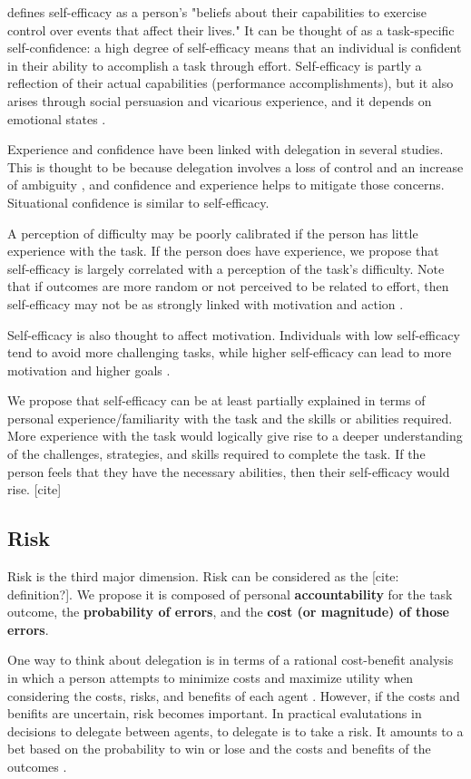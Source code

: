 \documentclass[letterpaper]{article} %
\begin{document}
\cite{Bandura-89} defines self-efficacy as a person's "beliefs about their capabilities to exercise control over events that affect their lives." It can be thought of as a task-specific self-confidence: a high degree of self-efficacy means that an individual is confident in their ability to accomplish a task through effort. Self-efficacy  is partly a reflection of their actual capabilities (performance accomplishments), but it also arises through social persuasion and vicarious experience, and it depends on emotional states \cite{Bandura-89}.

Experience and confidence have been linked with delegation in several studies. This is thought to be because delegation involves a loss of control and an increase of ambiguity \cite{milewski1}, and confidence and experience helps to mitigate those concerns. Situational confidence is similar to self-efficacy.

A perception of difficulty may be poorly calibrated if the person has little experience with the task. If the person does have experience, we propose that self-efficacy is largely correlated with a perception of the task's difficulty. Note that if outcomes are more random or not perceived to be related to effort, then self-efficacy may not be as strongly linked with motivation and action \cite{Bandura-agency}.

Self-efficacy is also thought to affect motivation.  Individuals with low self-efficacy tend to avoid more challenging tasks, while higher self-efficacy can lead to more motivation and higher goals \cite{Bandura-89}.

We propose that self-efficacy can be at least partially explained in terms of personal experience/familiarity with the task and the skills or abilities required. More experience with the task would logically give rise to a deeper understanding of the challenges, strategies, and skills required to complete the task. If the person feels that they have the necessary abilities, then their self-efficacy would rise. [cite]

\subsection{Risk}
Risk is the third major dimension. Risk can be considered as the [cite: definition?]. We propose it is composed of personal \textbf{accountability} for the task outcome, the \textbf{probability of errors}, and the \textbf{cost (or magnitude) of those errors}.

One way to think about delegation is in terms of a rational cost-benefit analysis in which a person attempts to minimize costs and maximize utility when considering the costs, risks, and benefits of each agent \cite{castelfranchi-deleg-1998}. However, if the costs and benifits are uncertain, risk becomes important. In practical evalutations in decisions to delegate between agents, to delegate is to take a risk. It amounts to a bet based on the probability to win or lose and the costs and benefits of the outcomes \cite{castelfranchi-deleg-1998}. 
\end{document}
